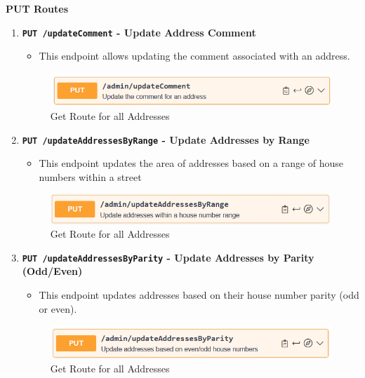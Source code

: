     \textbf{PUT Routes}
    \begin{enumerate}
        \item \textbf{\texttt{PUT /updateComment} - Update Address Comment}
        \begin{itemize}
            \item This endpoint allows updating the comment associated with an address.
        \end{itemize} 
        \begin{figure} [H]
            \centering
            \includegraphics [width=1\textwidth] {images/andreas/praxis/updateComment.png}
            \caption{Get Route for all Addresses}
        \end{figure}

        \item \textbf{\texttt{PUT /updateAddressesByRange} - Update Addresses by Range}
        \begin{itemize}
            \item This endpoint updates the area of addresses based on a range of house numbers within a street
        \end{itemize} 
        \begin{figure} [H]
            \centering
            \includegraphics [width=1\textwidth] {images/andreas/praxis/updateAddressesHouseRange.png}
            \caption{Get Route for all Addresses}
        \end{figure}

        \item \textbf{\texttt{PUT /updateAddressesByParity} - Update Addresses by Parity (Odd/Even)}
        \begin{itemize}
            \item This endpoint updates addresses based on their house number parity (odd or even).
        \end{itemize} 
        \begin{figure} [H]
            \centering
            \includegraphics [width=1\textwidth] {images/andreas/praxis/updateAddressesOddEven.png}
            \caption{Get Route for all Addresses}
        \end{figure}


\end{enumerate}
